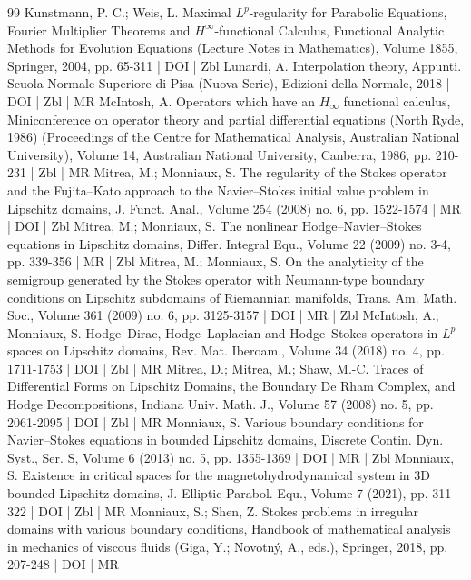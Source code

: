 \begin{thebibliography}{99}
 Kunstmann, P. C.; Weis, L. Maximal ${L}^p$-regularity for Parabolic Equations, Fourier Multiplier Theorems and ${H}^{\infty }$-functional Calculus, Functional Analytic Methods for Evolution Equations (Lecture Notes in Mathematics), Volume 1855, Springer, 2004, pp. 65-311 | DOI | Zbl
 Lunardi, A. Interpolation theory, Appunti. Scuola Normale Superiore di Pisa (Nuova Serie), Edizioni della Normale, 2018 | DOI | Zbl | MR
 McIntosh, A. Operators which have an ${H}_\infty $ functional calculus, Miniconference on operator theory and partial differential equations (North Ryde, 1986) (Proceedings of the Centre for Mathematical Analysis, Australian National University), Volume 14, Australian National University, Canberra, 1986, pp. 210-231 | Zbl | MR
 Mitrea, M.; Monniaux, S. The regularity of the Stokes operator and the Fujita–Kato approach to the Navier–Stokes initial value problem in Lipschitz domains, J. Funct. Anal., Volume 254 (2008) no. 6, pp. 1522-1574 | MR | DOI | Zbl
 Mitrea, M.; Monniaux, S. The nonlinear Hodge–Navier–Stokes equations in Lipschitz domains, Differ. Integral Equ., Volume 22 (2009) no. 3-4, pp. 339-356 | MR | Zbl
 Mitrea, M.; Monniaux, S. On the analyticity of the semigroup generated by the Stokes operator with Neumann-type boundary conditions on Lipschitz subdomains of Riemannian manifolds, Trans. Am. Math. Soc., Volume 361 (2009) no. 6, pp. 3125-3157 | DOI | MR | Zbl
 McIntosh, A.; Monniaux, S. Hodge–Dirac, Hodge–Laplacian and Hodge–Stokes operators in ${L}^p$ spaces on Lipschitz domains, Rev. Mat. Iberoam., Volume 34 (2018) no. 4, pp. 1711-1753 | DOI | Zbl | MR
 Mitrea, D.; Mitrea, M.; Shaw, M.-C. Traces of Differential Forms on Lipschitz Domains, the Boundary De Rham Complex, and Hodge Decompositions, Indiana Univ. Math. J., Volume 57 (2008) no. 5, pp. 2061-2095 | DOI | Zbl | MR
 Monniaux, S. Various boundary conditions for Navier–Stokes equations in bounded Lipschitz domains, Discrete Contin. Dyn. Syst., Ser. S, Volume 6 (2013) no. 5, pp. 1355-1369 | DOI | MR | Zbl
 Monniaux, S. Existence in critical spaces for the magnetohydrodynamical system in 3D bounded Lipschitz domains, J. Elliptic Parabol. Equ., Volume 7 (2021), pp. 311-322 | DOI | Zbl | MR
 Monniaux, S.; Shen, Z. Stokes problems in irregular domains with various boundary conditions, Handbook of mathematical analysis in mechanics of viscous fluids (Giga, Y.; Novotný, A., eds.), Springer, 2018, pp. 207-248 | DOI | MR

\end{thebibliography}
